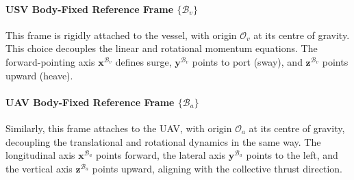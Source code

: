\paragraph{USV Body-Fixed Reference Frame $\{\mathcal{B}_v\}$}
This frame is rigidly attached to the vessel, with origin $\mathcal{O}_v$ at its centre of gravity. This choice decouples the linear and rotational momentum equations. The forward-pointing axis $\mathbf{x}^{\mathcal{B}_v}$ defines surge, $\mathbf{y}^{\mathcal{B}_v}$ points to port (sway), and $\mathbf{z}^{\mathcal{B}_v}$ points upward (heave).

\paragraph{UAV Body-Fixed Reference Frame $\{\mathcal{B}_a\}$}
Similarly, this frame attaches to the UAV, with origin $\mathcal{O}_a$ at its centre of gravity, decoupling the translational and rotational dynamics in the same way. The longitudinal axis $\mathbf{x}^{\mathcal{B}_a}$ points forward, the lateral axis $\mathbf{y}^{\mathcal{B}_a}$ points to the left, and the vertical axis $\mathbf{z}^{\mathcal{B}_a}$ points upward, aligning with the collective thrust direction.

